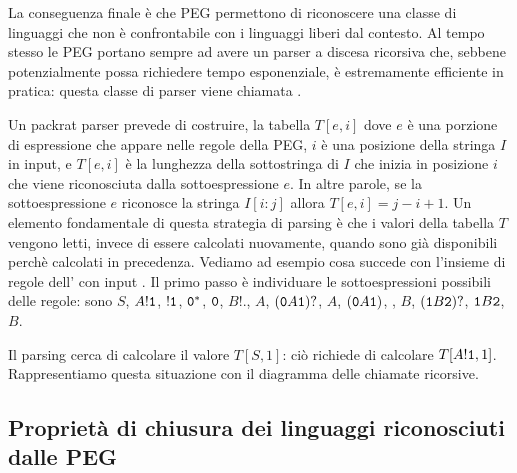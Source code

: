 La conseguenza finale è che PEG permettono di riconoscere una classe di  linguaggi che non è confrontabile con i
linguaggi liberi dal contesto.
Al tempo stesso le PEG portano sempre ad avere un parser a discesa ricorsiva che, sebbene  potenzialmente possa
richiedere tempo esponenziale, è estremamente efficiente in pratica: questa classe di parser viene chiamata .

Un packrat parser prevede di costruire, la tabella $T[e,i]$ dove $e$ è una porzione di espressione che appare nelle
regole della PEG, $i$ è una posizione della stringa $I$ in  input, e $T[e,i]$ è la lunghezza della sottostringa di $I$
che inizia in posizione $i$ che viene riconosciuta dalla sottoespressione $e$.
In altre parole, se la sottoespressione $e$ riconosce la stringa $I[i:j]$ allora $T[e,i] = j-i+1$.
Un elemento fondamentale di questa strategia di parsing è che i valori della tabella $T$ vengono letti, invece di essere
calcolati nuovamente, quando sono già disponibili perchè calcolati in precedenza.
Vediamo ad esempio cosa succede con l'insieme di regole dell' con input \zero\zero\uno\uno\due\due.
Il primo passo è individuare le sottoespressioni possibili delle regole: sono $S$,
$A !\mathtt{1}$, $!\mathtt{1}$, $\mathtt{0}{}^{\ast}$, $\mathtt{0}$, $B !.$,
$A$, $(\mathtt{0} A \mathtt{1})?$, $A$, $(\mathtt{0} A \mathtt{1})$, \uno,
$B$, $(\mathtt{1} B \mathtt{2})?$, $\mathtt{1} B \mathtt{2}$, $B$.

Il parsing cerca di calcolare il valore $T[S,1]$: ciò richiede di calcolare $T[A !\mathtt{1}, 1]$.
Rappresentiamo questa situazione con il diagramma delle chiamate ricorsive.



\subsection{Proprietà di chiusura dei linguaggi riconosciuti dalle PEG}\label{sec:peg-chiusura}


